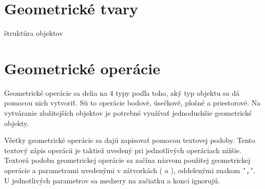 








\chapter{Geometrické tvary}
\label{chapt:Geometrické_tvary}
štruktúra objektov



\chapter{Geometrické operácie}
Geometrické operácie sa delia na 4 typy podľa toho, aký typ objektu sa dá pomocou nich vytvoriť. Sú to operácie bodové, úsečkové, plošné a priestorové. Na vytváranie zložitejších objektov je potrebné využívať jednoduchšie geometrické objekty. 

Všetky geometrické operácie sa dajú zapisovať pomocou textovej podoby. Tento textový zápis operácii je taktiež uvedený pri jednotlivých operáciach nižšie. 
Textová podoba geometrickej operácie sa začína názvom použitej geometrickej operácie a parametrami uvedenými v zátvorkách ( a ), oddelenými znakom \texttt{','}.  U jednotlivých parametrov sa medzery na začiatku a konci ignorujú.

